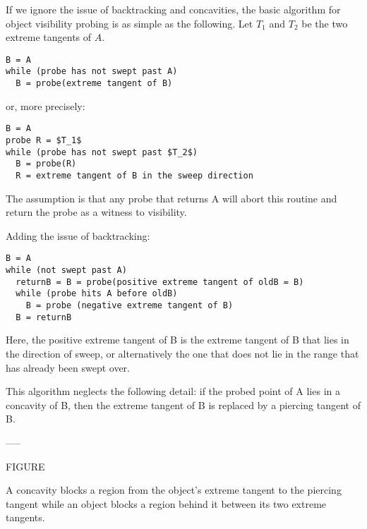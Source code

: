 \documentclass[12pt]{article}
\begin{document}
If we ignore the issue of backtracking and concavities, the basic algorithm
for object visibility probing is as simple as the following.
Let $T_1$ and $T_2$ be the two extreme tangents of $A$.

\begin{verbatim}
B = A
while (probe has not swept past A)
  B = probe(extreme tangent of B)
\end{verbatim}

or, more precisely:

\begin{verbatim}
B = A
probe R = $T_1$
while (probe has not swept past $T_2$)
  B = probe(R)
  R = extreme tangent of B in the sweep direction
\end{verbatim}

The assumption is that any probe that returns A will abort this routine and
return the probe as a witness to visibility.

Adding the issue of backtracking:
\begin{verbatim}
B = A
while (not swept past A)
  returnB = B = probe(positive extreme tangent of oldB = B)
  while (probe hits A before oldB)
    B = probe (negative extreme tangent of B)
  B = returnB
\end{verbatim}

Here, the positive extreme tangent of B is the extreme tangent of B that lies
in the direction of sweep, or alternatively the one that does not lie in the range
that has already been swept over.

This algorithm neglects the following detail: if the probed point of A lies in
a concavity of B, then the extreme tangent of B is replaced by a piercing tangent of B.

-----

FIGURE

A concavity blocks a region from the object's extreme tangent to the piercing tangent
while an object blocks a region behind it between its two extreme tangents.
\end{document}
